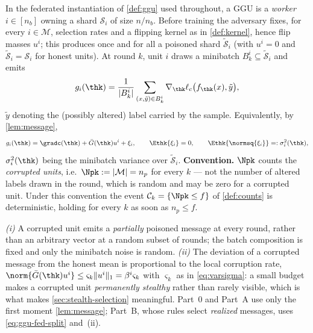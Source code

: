 \begin{definition}
\label{def:ggu-fed}
In the federated instantiation of \cref{def:ggu} used throughout, a GGU is a \emph{worker}
$i\in[n_b]$ owning a shard $\mathcal{S}_i$ of size $n/n_b$. Before training the adversary fixes,
for every $i\in\mathcal{M}$, selection rates and a flipping kernel as in \cref{def:kernel}, hence
flip masses $u^i$; this produces once and for all a poisoned shard $\tilde{\mathcal{S}}_i$
(with $u^i=0$ and $\tilde{\mathcal{S}}_i=\mathcal{S}_i$ for honest units). At round $k$, unit $i$
draws a minibatch $B^i_k\subseteq\tilde{\mathcal{S}}_i$ and emits
\begin{equation}
g_i(\thk)=\frac{1}{|B^i_k|}\sum_{(x,\tilde y)\in B^i_k}\nabla_{\thk}\ell_c\big(f_{\thk}(x),\tilde y\big),
\label{eq:ggu-fed}
\end{equation}
$\tilde y$ denoting the (possibly altered) label carried by the sample. Equivalently, by
\cref{lem:message},
\begin{equation}
g_i(\thk)=\gradc(\thk)+\bar G(\thk)u^i+\xi_i,
\qquad \Ethk{\xi_i}=0,
\qquad \Ethk{\normsq{\xi_i}}=:\sigma_i^2(\thk),
\label{eq:ggu-fed-split}
\end{equation}
$\sigma_i^2(\thk)$ being the minibatch variance over $\tilde{\mathcal{S}}_i$.
\textbf{Convention.} $\Npk$ counts the \emph{corrupted units}, i.e.\ $\Npk:=|\mathcal{M}|=n_p$
for every $k$ --- not the number of altered labels drawn in the round, which is random and may
be zero for a corrupted unit. Under this convention the event $\mathcal{C}_k=\{\Npk\le f\}$ of
\cref{def:counts} is deterministic, holding for every $k$ as soon as $n_p\le f$.
\end{definition}

\begin{remark}
\label{rem:ggu-fed}
\emph{(i)} A corrupted unit emits a \emph{partially} poisoned message at every round, rather than
an arbitrary vector at a random subset of rounds; the batch composition is fixed and only the
minibatch noise is random.
\emph{(ii)} The deviation of a corrupted message from the honest mean is proportional to the local
corruption rate, $\norm{\bar G(\thk)u^i}\le\varsigma_k\|u^i\|_1=\beta^i\varsigma_k$ with
$\varsigma_k$ as in \cref{eq:varsigma}: a small budget makes a corrupted unit \emph{permanently
stealthy} rather than rarely visible, which is what makes \cref{sec:stealth-selection} meaningful.
Part~0 and Part~A use only the first moment \cref{lem:message}; Part~B, whose rules select
\emph{realized} messages, uses \cref{eq:ggu-fed-split} and~(ii).
\end{remark}

